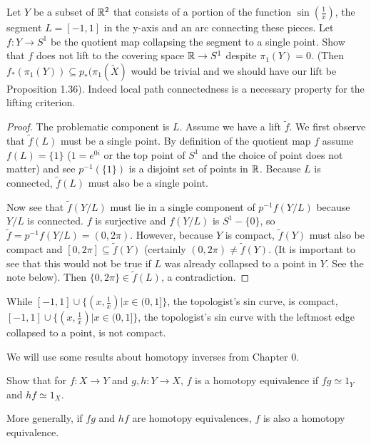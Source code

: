 \documentclass[10pt]{article}
\begin{document}
\begin{exercise}
	Let $Y$ be a subset of $\mathbb{R}^2$ that consists of a portion of the function
	$\sin(\frac{1}{x})$, the segment $L = [-1, 1]$ in the y-axis and an arc
	connecting these pieces. Let $f: Y \to S^1$ be the quotient map collapsing
	the segment to a single point. Show that $f$ does not lift to the covering
	space $\mathbb{R} \to S^1$ despite $\pi_1(Y) = 0$. (Then $f_*(\pi_1(Y)) \subseteq
	p_*(\pi_1(\tilde{X})$ would be trivial and we should have our lift be
	Proposition 1.36). Indeed local path connectedness is a necessary property
	for the lifting criterion.
\end{exercise}

\begin{proof}
	The problematic component is $L$. Assume we have a lift $\tilde{f}$. We first
	observe that $\tilde{f}(L)$ must be a single point. By definition of the
	quotient map $f$ assume $f(L) = \{1\}$ ($1 = e^{0i}$ or the top point of
	$S^1$ and the choice of point does not matter) and see $p^{-1}(\{1\})$ is a
	disjoint set of points in $\mathbb{R}$.  Because $L$ is connected, $\tilde{f}(L)$
	must also be a single point.

	Now see that $\tilde{f}(Y / L)$ must lie in a single component of $p^{-1}f(Y
	/ L)$ because $Y / L$ is connected. $f$ is surjective and $f(Y / L)$ is $S^1
	- \{0\}$, so $\tilde{f} = p^{-1}f(Y/L) = (0, 2\pi)$. However, because $Y$ is
	compact, $\tilde{f}(Y)$ must also be compact and $[0, 2\pi] \subseteq
	\tilde{f}(Y)$ (certainly $(0, 2\pi) \neq \tilde{f}(Y)$. (It is important to
	see that this would not be true if $L$ was already collapsed to a point in
	$Y$. See the note below). Then $\{ 0, 2\pi \} \in \tilde{f}(L)$, a
	contradiction.
\end{proof}

\begin{note}
	While $[-1, 1] \cup \{ (x, \frac{1}{x}) | x \in (0, 1] \}$, the topologist's
	sin curve, is compact, $[-1, 1] \cup \{ (x, \frac{1}{x}) | x \in (0, 1] \}$,
	the topologist's sin curve with the leftmost edge collapsed to a point, is
	not compact.
\end{note}

We will use some results about homotopy inverses from Chapter 0.

\begin{exercise}
	Show that for $f: X \to Y$ and $g, h: Y \to X$, $f$ is a homotopy equivalence if $fg
	\simeq 1_Y$ and $hf \simeq 1_X$.

	More generally, if $fg$ and $hf$ are homotopy equivalences, $f$ is also a
	homotopy equivalence.
\end{exercise}
\end{document}
